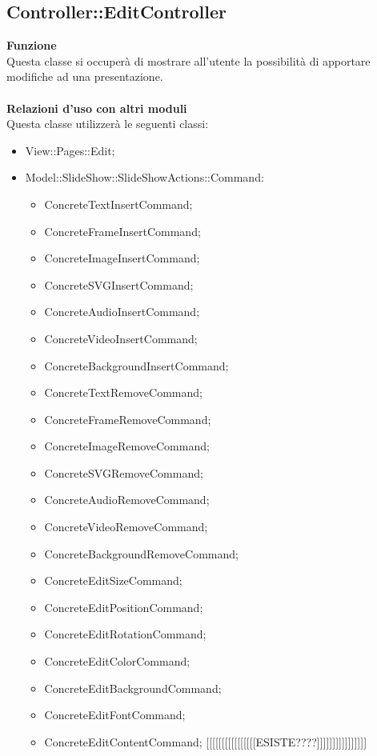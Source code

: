 {				\subsection{Controller::EditController}{
					\textbf{Funzione}\\
					\indent Questa classe si occuperà di mostrare all'utente la possibilità di apportare modifiche ad una presentazione.\\\\
					\textbf{Relazioni d'uso con altri moduli}\\
					\indent Questa classe utilizzerà le seguenti classi:
					\begin{itemize}
						\item View::Pages::Edit;
						\item Model::SlideShow::SlideShowActions::Command:
						\begin{itemize}
							\item ConcreteTextInsertCommand;
							\item ConcreteFrameInsertCommand;
							\item ConcreteImageInsertCommand;
							\item ConcreteSVGInsertCommand;
							\item ConcreteAudioInsertCommand;
							\item ConcreteVideoInsertCommand;
							\item ConcreteBackgroundInsertCommand;
							\item ConcreteTextRemoveCommand;
							\item ConcreteFrameRemoveCommand;
							\item ConcreteImageRemoveCommand;
							\item ConcreteSVGRemoveCommand;
							\item ConcreteAudioRemoveCommand;
							\item ConcreteVideoRemoveCommand;
							\item ConcreteBackgroundRemoveCommand;
							\item ConcreteEditSizeCommand;
							\item ConcreteEditPositionCommand;
							\item ConcreteEditRotationCommand;
							\item ConcreteEditColorCommand;
							\item ConcreteEditBackgroundCommand;
							\item ConcreteEditFontCommand;
							\item ConcreteEditContentCommand; [[[[[[[[[[[[[[[[ESISTE????]]]]]]]]]]]]]]]]

\end{itemize}
\end{itemize}}}
